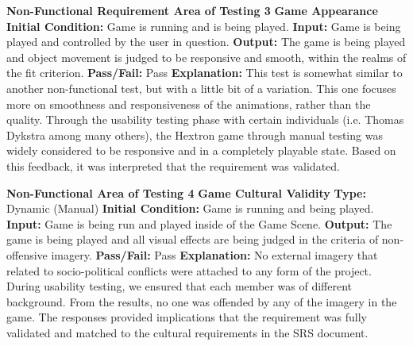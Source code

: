 \documentclass[12pt, titlepage]{article}
\begin{document}
\noindent \textbf{Non-Functional Requirement Area of Testing 3}
\newline
\textbf{Game Appearance}
\newline
\textbf{Initial Condition:} Game is running and is being played.
\newline
\textbf{Input:} Game is being played and controlled by the user in question.
\newline 
\textbf{Output:} The game is being played and object movement is judged to be responsive and smooth, within the realms of the fit criterion.
\newline
\textbf{Pass/Fail:} Pass
\newline
\textbf{Explanation:} This test is somewhat similar to another non-functional test, but with a little bit of a variation. This one focuses more on smoothness and responsiveness of the animations, rather than the quality. Through the usability testing phase with certain individuals (i.e. Thomas Dykstra among many others), the Hextron game through manual testing was widely considered to be responsive and in a completely playable state. Based on this feedback, it was interpreted that the requirement was validated. \newline \newline 

\noindent \textbf{Non-Functional Area of Testing 4}
\textbf{Game Cultural Validity}
\newline
\textbf{Type:} Dynamic (Manual)
\newline
\textbf{Initial Condition:} Game is running and being played.
\newline
\textbf{Input:} Game is being run and played inside of the Game Scene.
\newline
\textbf{Output:} The game is being played and all visual effects are being judged in the criteria of non-offensive imagery. 
\newline
\textbf{Pass/Fail:} Pass
\newline 
\textbf{Explanation:} No external imagery that related to socio-political conflicts were attached to any form of the project. During usability testing, we ensured that each member was of different background. From the results, no one was offended by any of the imagery in the game. The responses provided implications that the requirement was fully validated and matched to the cultural requirements in the SRS document. \newline \newline  
\end{document}
